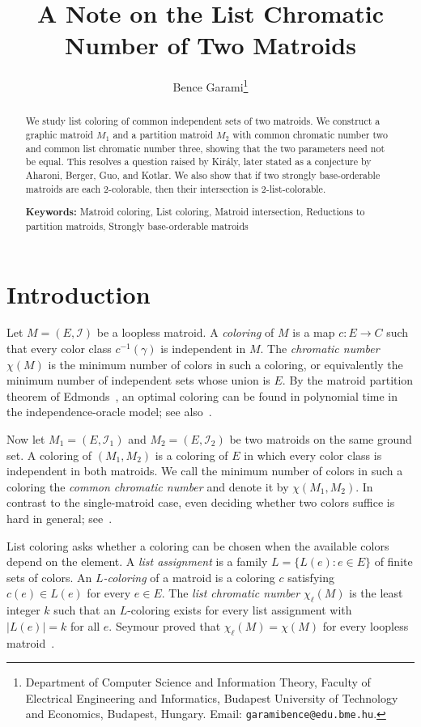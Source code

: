 \documentclass{article}
\title{A Note on the List Chromatic Number of Two Matroids}
\author{
Bence Garami\thanks{Department of Computer Science and Information Theory, Faculty of Electrical Engineering and Informatics, Budapest University of Technology and Economics, Budapest, Hungary. Email: \texttt{garamibence@edu.bme.hu}.}
}
\date{}
\theoremstyle{plain}
\theoremstyle{definition}
\newcommand{\cI}{\mathcal{I}}
\begin{document}
\maketitle
\thispagestyle{empty}

\begin{abstract}
We study list coloring of common independent sets of two matroids. We construct a graphic matroid $M_1$ and a partition matroid $M_2$ with common chromatic number two and common list chromatic number three, showing that the two parameters need not be equal. This resolves a question raised by Kir\'aly, later stated as a conjecture by Aharoni, Berger, Guo, and Kotlar. We also show that if two strongly base-orderable matroids are each $2$-colorable, then their intersection is $2$-list-colorable.

\medskip
\noindent\textbf{Keywords:} Matroid coloring, List coloring, Matroid intersection, Reductions to partition matroids, Strongly base-orderable matroids
\end{abstract}

\section{Introduction}
\label{sec:intro}

Let $M=(E,\cI)$ be a loopless matroid. A \textit{coloring} of $M$ is a map $c\colon E\to C$ such that every color class $c^{-1}(\gamma)$ is independent in $M$. The \textit{chromatic number} $\chi(M)$ is the minimum number of colors in such a coloring, or equivalently the minimum number of independent sets whose union is $E$. By the matroid partition theorem of Edmonds~\cite{edmonds1965minimum}, an optimal coloring can be found in polynomial time in the independence-oracle model; see also~\cite[Chapter~42]{schrijver2003combinatorial}.

Now let $M_1=(E,\cI_1)$ and $M_2=(E,\cI_2)$ be two matroids on the same ground set. A coloring of $(M_1,M_2)$ is a coloring of $E$ in which every color class is independent in both matroids. We call the minimum number of colors in such a coloring the \textit{common chromatic number} and denote it by $\chi(M_1,M_2)$. In contrast to the single-matroid case, even deciding whether two colors suffice is hard in general; see~\cite{berczi2021complexity}.

List coloring asks whether a coloring can be chosen when the available colors depend on the element. A \textit{list assignment} is a family $L=\{L(e)\colon e\in E\}$ of finite sets of colors. An \textit{$L$-coloring} of a matroid is a coloring $c$ satisfying $c(e)\in L(e)$ for every $e\in E$. The \textit{list chromatic number} $\chi_\ell(M)$ is the least integer $k$ such that an $L$-coloring exists for every list assignment with $|L(e)|=k$ for all $e$. Seymour proved that $\chi_\ell(M)=\chi(M)$ for every loopless matroid~\cite{seymour1998note}.
\end{document}
